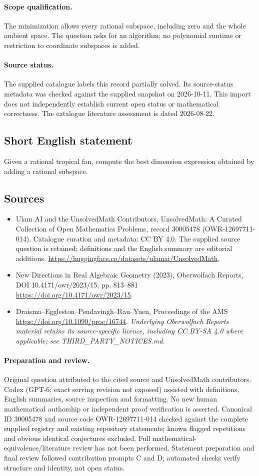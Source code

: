\documentclass[11pt]{article}
\begin{document}
\paragraph{Scope qualification.}
The minimization allows every rational subspace, including zero and the whole ambient space. The question asks for an algorithm; no polynomial runtime or restriction to coordinate subspaces is added.
\paragraph{Source status.}
The supplied catalogue labels this record partially solved. Its source-status metadata was checked against the supplied snapshot on 2026-10-11. This import does not independently establish current open status or mathematical correctness. The catalogue literature assessment is dated 2026-08-22.
\subsection{Short English statement}
Given a rational tropical fan, compute the best dimension expression obtained by adding a rational subspace.
\subsection{Sources}
\begin{itemize}
\item[S1] Ulam AI and the UnsolvedMath Contributors, UnsolvedMath: A Curated Collection of Open Mathematics Problems, record 30005478 (OWR-12697711-014). Catalogue curation and metadata: CC BY 4.0. The supplied source question is retained; definitions and the English summary are editorial additions.
\url{https://huggingface.co/datasets/ulamai/UnsolvedMath}.
\item[S2] New Directions in Real Algebraic Geometry (2023), Oberwolfach Reports, DOI 10.4171/owr/2023/15, pp. 813--881
\url{https://doi.org/10.4171/owr/2023/15}.
\item[S3] Draisma--Eggleston--Pendavingh--Rau--Yuen, Proceedings of the AMS
\url{https://doi.org/10.1090/proc/16744}.
\textit{Underlying Oberwolfach Reports material retains its source-specific licence, including CC BY-SA 4.0 where applicable; see THIRD\_PARTY\_NOTICES.md.}
\end{itemize}
\paragraph{Preparation and review.}
Original question attributed to the cited source and UnsolvedMath contributors. Codex (GPT-6; exact serving revision not exposed) assisted with definitions, English summaries, source inspection and formatting. No new human mathematical authorship or independent proof verification is asserted. Canonical ID 30005478 and source code OWR-12697711-014 checked against the complete supplied registry and existing repository statements; known flagged repetitions and obvious identical conjectures excluded. Full mathematical-equivalence/literature review has not been performed. Statement preparation and final review followed contribution prompts C and D; automated checks verify structure and identity, not open status.
\label{end:30005478}
\end{document}
